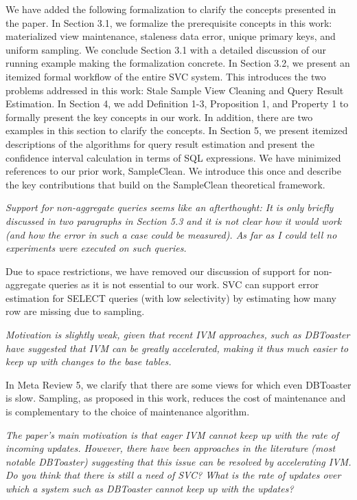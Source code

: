 We have added the following formalization to clarify the concepts presented in the paper. In Section 3.1, we formalize the prerequisite concepts in this work: materialized view maintenance, staleness data error, unique primary keys, and uniform sampling. We conclude Section 3.1 with a detailed discussion of our running example making the formalization concrete. In Section 3.2, we present an itemized formal workflow of the entire SVC system. This introduces the two problems addressed in this work: Stale Sample View Cleaning and Query Result Estimation. In Section 4, we add Definition 1-3, Proposition 1, and Property 1 to formally present the key concepts in our work. In addition, there are two examples in this section to clarify the concepts. In Section 5, we present itemized descriptions of the algorithms for query result estimation and present the confidence interval calculation in terms of SQL expressions. We have minimized references to our prior work, SampleClean. We introduce this once and describe the key contributions that build on the SampleClean theoretical framework.

\vspace{1em}
\emph{Support for non-aggregate queries seems like an afterthought: It is only briefly discussed in two paragraphs in Section 5.3 and it is not clear how it would work (and how the error in such a case could be measured). As far as I could tell no experiments were executed on such queries.}

Due to space restrictions, we have removed our discussion of support for non-aggregate queries as it is not essential to our work. SVC can support error estimation for SELECT queries (with low selectivity) by estimating how many row are missing due to sampling.

\vspace{1em}
\emph{Motivation is slightly weak, given that recent IVM approaches, such as DBToaster have suggested that IVM can be greatly accelerated, making it thus much easier to keep up with changes to the base tables.}

In Meta Review 5, we clarify that there are some views for which even DBToaster is slow. Sampling, as proposed in this work, reduces the cost of maintenance and is complementary to the choice of maintenance algorithm.

\vspace{1em}
\emph{The paper's main motivation is that eager IVM cannot keep up with the rate of incoming updates. However, there have been approaches in the literature (most notable DBToaster) suggesting that this issue can be resolved by accelerating IVM. Do you think that there is still a need of SVC? What is the rate of updates over which a system such as DBToaster cannot keep up with the updates?}

